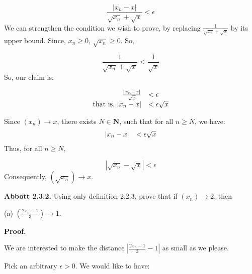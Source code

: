 \documentclass[10pt]{article}
\begin{document}
\begin{equation*}
\frac{|x_{n} -x|}{\sqrt{x_{n}} +\sqrt{x}} < \epsilon 
\end{equation*}
We can strengthen the condition we wish to prove, by replacing $\displaystyle \frac{1}{\sqrt{x_{n}} +\sqrt{x}}$ by its upper bound. Since, $\displaystyle x_{n} \geq 0$, $\displaystyle \sqrt{x_{n}} \geq 0$. So, 


\begin{equation*}
\frac{1}{\sqrt{x_{n}} +\sqrt{x}} < \frac{1}{\sqrt{x}}
\end{equation*}
So, our claim is:


\begin{equation*}
\begin{array}{ r l }
\frac{|x_{n} -x|}{\sqrt{x}} & < \epsilon \\
\text{that is, } |x_{n} -x| & < \epsilon \sqrt{x}
\end{array}
\end{equation*}


Since $\displaystyle ( x_{n})\rightarrow x$, there exists $\displaystyle N\in \mathbf{N}$, such that for all $\displaystyle n\geq N$, we have:
\begin{equation*}
\begin{array}{ r l }
|x_{n} -x| & < \epsilon \sqrt{x}
\end{array}
\end{equation*}
Thus, for all $\displaystyle n\geq N$,


\begin{equation*}
|\sqrt{x_{n}} -\sqrt{x} |< \epsilon 
\end{equation*}
Consequently, $\displaystyle \left(\sqrt{x_{n}}\right)\rightarrow x$.



\textbf{Abbott 2.3.2. }Using only definition 2.2.3, prove that if $\displaystyle ( x_{n})\rightarrow 2$, then



(a) $\displaystyle \left(\frac{2x_{n} -1}{3}\right)\rightarrow 1$.



\textbf{Proof}.



We are interested to make the distance $\displaystyle \left| \frac{2x_{n} -1}{3} -1\right| $ as small as we please.



Pick an arbitrary $\displaystyle \epsilon  >0$. We would like to have:
\end{document}
